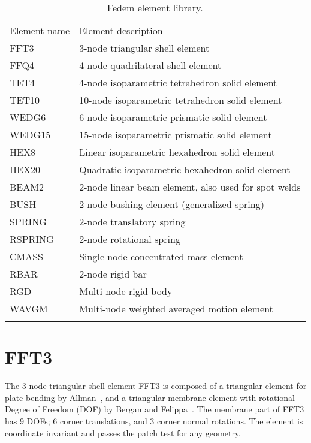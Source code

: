 \begin{table}[b]
\medskip
\begin{center}
\begin{tabular}{ll}
\noalign{\hrule\smallskip}
Element name & Element description \\
\noalign{\smallskip\hrule\smallskip}
FFT3   &  3-node triangular shell element \\
FFQ4   &  4-node quadrilateral shell element \\
TET4   &  4-node isoparametric tetrahedron solid element \\
TET10  & 10-node isoparametric tetrahedron solid element \\
WEDG6  &  6-node isoparametric prismatic solid element \\
WEDG15 & 15-node isoparametric prismatic solid element \\
HEX8   &   Linear isoparametric hexahedron solid element \\
HEX20  &Quadratic isoparametric hexahedron solid element \\
BEAM2  & 2-node linear beam element, also used for spot welds \\
BUSH   & 2-node bushing element (generalized spring) \\
SPRING & 2-node translatory spring \\
RSPRING& 2-node rotational spring \\
CMASS  & Single-node concentrated mass element \\
RBAR   & 2-node rigid bar \\
RGD    & Multi-node rigid body \\
WAVGM  & Multi-node weighted averaged motion element \\
\noalign{\smallskip\hrule}
\end{tabular}
\end{center}
\caption{Fedem element library.}
\label{tab:element library}
\end{table}

\section{FFT3}
\label{s:FFT3}

The 3-node triangular shell element FFT3 is composed of a
triangular element for plate bending by Allman~\cite{AllmanTriPlate},
and a triangular membrane element with rotational Degree of Freedom (DOF) by
Bergan and Felippa~\cite{BerganFelippaTri}.
The membrane part of FFT3 has 9 DOFs;
6 corner translations, and 3 corner normal rotations.
The element is coordinate invariant and passes the patch test for any geometry.

